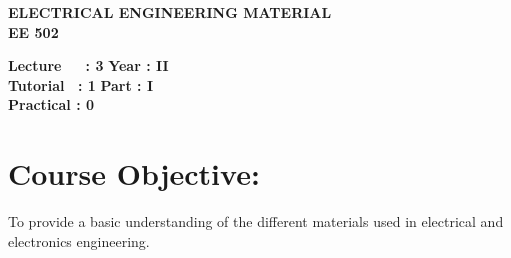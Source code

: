 \begin{center}
    \textbf{\huge{\uppercase{Electrical Engineering Material}}}
    \\
    \vspace{.5cm}
    \textbf{\large{EE 502}}
\end{center}

\noindent\textbf{Lecture\ \ \ : 3} \hfill \textbf{Year : II } \\
\textbf{Tutorial \ : 1} \hfill \textbf{Part : I } \\
\textbf{Practical : 0}  \\

\par
\noindent 
\section*{Course Objective:}
To provide a basic understanding of the different materials used in electrical and electronics engineering.


